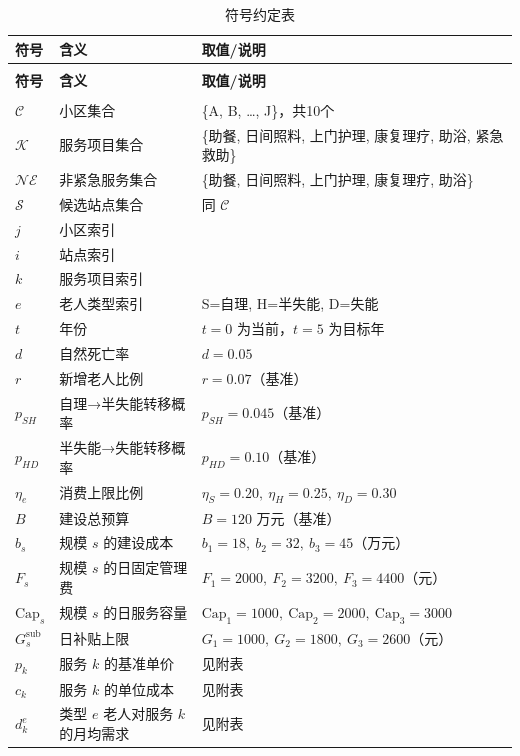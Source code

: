 \documentclass[UTF8]{ctexart}
\begin{document}
{\small
\renewcommand{\arraystretch}{1.3}
\begin{longtable}{|>{\centering\arraybackslash}p{2cm}|>{\centering\arraybackslash}p{6cm}|>{\centering\arraybackslash}p{3.5cm}|}
\caption{符号约定表}\\
\hline
\textbf{符号} & \textbf{含义} & \textbf{取值/说明} \\
\hline
\endfirsthead

\multicolumn{3}{c}{续表} \\
\hline
\textbf{符号} & \textbf{含义} & \textbf{取值/说明} \\
\hline
\endhead

\hline
\multicolumn{3}{r}{{续下页}} \\
\endfoot

\hline
\endlastfoot

$\mathcal{C}$ & 小区集合 & \{A, B, …, J\}，共10个 \\
$\mathcal{K}$ & 服务项目集合 & \{助餐, 日间照料, 上门护理, 康复理疗, 助浴, 紧急救助\} \\
$\mathcal{NE}$ & 非紧急服务集合 & \{助餐, 日间照料, 上门护理, 康复理疗, 助浴\} \\
$\mathcal{S}$ & 候选站点集合 & 同 $\mathcal{C}$ \\
$j$ & 小区索引 & \\
$i$ & 站点索引 & \\
$k$ & 服务项目索引 & \\
$e$ & 老人类型索引 & S=自理, H=半失能, D=失能 \\
$t$ & 年份 & $t=0$ 为当前，$t=5$ 为目标年 \\
$d$ & 自然死亡率 & $d=0.05$ \\
$r$ & 新增老人比例 & $r=0.07$（基准） \\
$p_{SH}$ & 自理→半失能转移概率 & $p_{SH}=0.045$（基准） \\
$p_{HD}$ & 半失能→失能转移概率 & $p_{HD}=0.10$（基准） \\
$\eta_e$ & 消费上限比例 & $\eta_S=0.20,\ \eta_H=0.25,\ \eta_D=0.30$ \\
$B$ & 建设总预算 & $B=120$ 万元（基准） \\
$b_s$ & 规模 $s$ 的建设成本 & $b_1=18,\ b_2=32,\ b_3=45$（万元） \\
$F_s$ & 规模 $s$ 的日固定管理费 & $F_1=2000,\ F_2=3200,\ F_3=4400$（元） \\
$\text{Cap}_s$ & 规模 $s$ 的日服务容量 & $\text{Cap}_1=1000,\ \text{Cap}_2=2000,\ \text{Cap}_3=3000$ \\
$G_s^{\text{sub}}$ & 日补贴上限 & $G_1=1000,\ G_2=1800,\ G_3=2600$（元） \\
$p_k$ & 服务 $k$ 的基准单价 & 见附表 \\
$c_k$ & 服务 $k$ 的单位成本 & 见附表 \\
$d_k^e$ & 类型 $e$ 老人对服务 $k$ 的月均需求 & 见附表 \\
\end{longtable}
}
\end{document}
